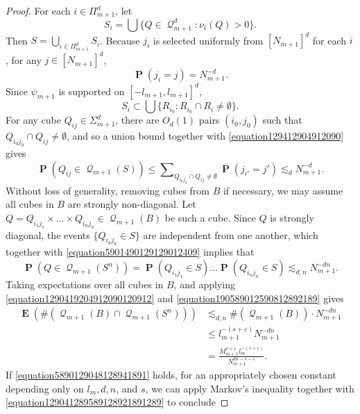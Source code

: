 \documentclass[12pt,reqno]{amsart}
\DeclareMathOperator{\EE}{\mathbf{E}}
\DeclareMathOperator{\PP}{\mathbf{P}}
\DeclareMathOperator{\DQ}{\mathcal{Q}}
\begin{document}
\begin{proof}
	For each $i \in \Pi_{m+1}^d$, let
	\[ S_i = \bigcup \{ Q \in \DQ_{m+1}^d: \nu_i(Q) > 0 \}. \]
	Then $S = \bigcup_{i \in \Pi_{m+1}^d} S_i$. Because $j_i$ is selected uniformly from $[N_{m+1}]^d$ for each $i$, for any $j \in [N_{m+1}]^d$,
    \begin{equation} \label{equation129412904912090}
        \PP(j_i = j) = N_{m+1}^{-d}.
    \end{equation}
    Since $\psi_{m+1}$ is supported on $[-l_{m+1},l_{m+1}]^d$,
	\[ S_i \subset \bigcup \{ R_{i_0} : R_{i_0} \cap R_i \neq \emptyset \}. \]
	For any cube $Q_{ij} \in \Sigma_{m+1}^d$, there are $O_d(1)$ pairs $(i_0,j_0)$ such that $Q_{i_0j_0} \cap Q_{ij} \neq \emptyset$, and so a union bound together with \eqref{equation129412904912090} gives
    \begin{equation} \label{equation5901490129129012409}
        \PP(Q_{ij} \in \DQ_{m+1}(S)) \leq \sum\nolimits_{Q_{i_0j_0} \cap Q_{ij} \neq \emptyset} \PP(j_{i'} = j') \lesssim_d N_{m+1}^{-d}.
    \end{equation}
	Without loss of generality, removing cubes from $B$ if necessary, we may assume all cubes in $B$ are strongly non-diagonal. Let $Q = Q_{i_1j_1} \times \dots \times Q_{i_nj_n} \in \DQ_{m+1}(B)$ be such a cube. Since $Q$ is strongly diagonal, the events $\{ Q_{i_kj_k} \in S \}$ are independent from one another, which together with \eqref{equation5901490129129012409} implies that
    \begin{equation} \label{equation190589012590812892189}
	   \PP(Q \in \DQ_{m+1}(S^n)) = \PP(Q_{i_1j_1} \in S) \dots \PP(Q_{i_nj_n} \in S) \lesssim_{d,n} N_{m+1}^{-dn}.
    \end{equation}
	Taking expectations over all cubes in $B$, and applying \eqref{equation1290419204912090120912} and \eqref{equation190589012590812892189} gives
    \begin{equation} \label{equation129041289589128921891289}
	\begin{split}
		\EE(\#(\DQ_{m+1}(B) \cap \DQ_{m+1}(S^n))) &\lesssim_{d,n} \#(\DQ_{m+1}(B)) \cdot N_{m+1}^{-dn}\\
		&\leq l_{m+1}^{-(s + \varepsilon)} N_{m+1}^{- dn}\\
		&= \frac{M_{m+1}^{s + \varepsilon} l_m^{-(s + \varepsilon)}}{N_{m+1}^{dn - s - \varepsilon}}.
	\end{split}
    \end{equation}
    If \eqref{equation5890129048128941891} holds, for an appropriately chosen constant depending only on $l_m, d, n$, and $s$, we can apply Markov's inequality together with \eqref{equation129041289589128921891289} to conclude

\end{proof}
\end{document}
